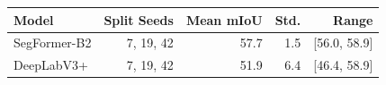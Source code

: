 \begin{tabular}{lrrrr}
\toprule
Model & Split Seeds & Mean mIoU & Std. & Range \\
\midrule
SegFormer-B2 & 7, 19, 42 & 57.7 & 1.5 & [56.0, 58.9] \\
DeepLabV3+ & 7, 19, 42 & 51.9 & 6.4 & [46.4, 58.9] \\
\bottomrule
\end{tabular}
